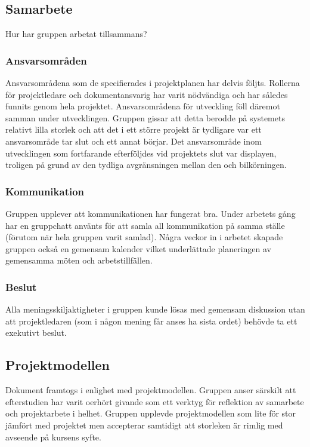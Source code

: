 \documentclass[10pt,oneside,swedish]{lips}
\begin{document}
\subsection{Samarbete}

Hur har gruppen arbetat tillsammans?

\subsubsection{Ansvarsområden}

Ansvarsområdena som de specifierades i projektplanen har delvis följts.
Rollerna för projektledare och dokumentansvarig har varit nödvändiga och har
således funnits genom hela projektet. Ansvarsområdena för utveckling föll
däremot samman under utvecklingen. Gruppen gissar att detta berodde på systemets
relativt lilla storlek och att det i ett större projekt är tydligare var ett
ansvarsområde tar slut och ett annat börjar. Det ansvarsområde inom utvecklingen
som fortfarande efterföljdes vid projektets slut var displayen, troligen på
grund av den tydliga avgränsningen mellan den och bilkörningen.

\subsubsection{Kommunikation}

Gruppen upplever att kommunikationen har fungerat bra. Under arbetets gång har
en gruppchatt använts för att samla all kommunikation på samma ställe (förutom
när hela gruppen varit samlad). Några veckor in i arbetet skapade gruppen också
en gemensam kalender vilket underlättade planeringen av gemensamma möten och
arbetstillfällen.

\subsubsection{Beslut}

Alla meningsskiljaktigheter i gruppen kunde lösas med gemensam diskussion utan
att projektledaren (som i någon mening får anses ha sista ordet) behövde ta ett
exekutivt beslut.

\subsection{Projektmodellen}

Dokument framtogs i enlighet med projektmodellen. Gruppen anser särskilt att
efterstudien har varit oerhört givande som ett verktyg för reflektion av
samarbete och projektarbete i helhet. Gruppen upplevde projektmodellen som lite
för stor jämfört med projektet men accepterar samtidigt att storleken är rimlig
med avseende på kursens syfte.
\end{document}
